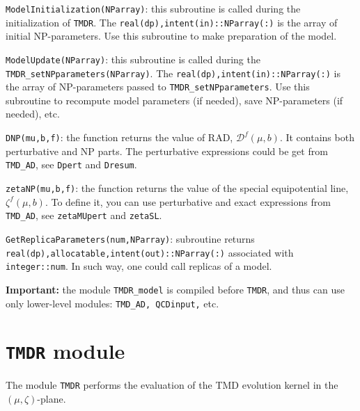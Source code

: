 \documentclass[prd,nofootinbib,eqsecnum,final]{revtex4}
\renewcommand{\(}{\left(}
\renewcommand{\)}{\right)}
\renewcommand{\[}{\left[}
\renewcommand{\]}{\right]}
\begin{document}
\texttt{ModelInitialization(NParray)}: this subroutine is called during the initialization of \texttt{TMDR}. The \texttt{real(dp),intent(in)::NParray(:)} is the array of initial NP-parameters. Use this subroutine to make preparation of the model.

\vspace{2mm}

\texttt{ModelUpdate(NParray)}: this subroutine is called during the \texttt{TMDR\_setNPparameters(NParray)}. The \texttt{real(dp),intent(in)::NParray(:)} is the array of NP-parameters passed to \texttt{TMDR\_setNPparameters}. Use this subroutine to recompute model parameters (if needed), save NP-parameters (if needed), etc.

\vspace{2mm}

\texttt{DNP(mu,b,f)}: the function returns the value of RAD, $\mathcal{D}^f(\mu,b)$. It contains both perturbative and NP parts. The perturbative expressions could be get from \texttt{TMD\_AD}, see \texttt{Dpert} and \texttt{Dresum}.

\vspace{2mm}

\texttt{zetaNP(mu,b,f)}: the function returns the value of the special equipotential line, $\zeta^f(\mu,b)$. To define it, you can use perturbative and exact expressions from \texttt{TMD\_AD}, see \texttt{zetaMUpert} and \texttt{zetaSL}.

\vspace{2mm}

\texttt{GetReplicaParameters(num,NParray)}: subroutine returns \texttt{real(dp),allocatable,intent(out)::NParray(:)} associated with \texttt{integer::num}. In such way, one could call replicas of a model.

\vspace{2mm}

\textbf{Important:} the module \texttt{TMDR\_model} is compiled before \texttt{TMDR}, and thus can use only lower-level modules: \texttt{TMD\_AD, QCDinput,} etc.

\newpage

\section{\texttt{TMDR} module}
\label{TMDR}

The module \texttt{TMDR} performs the evaluation of the TMD evolution kernel in the $(\mu,\zeta)$-plane. 
\end{document}
